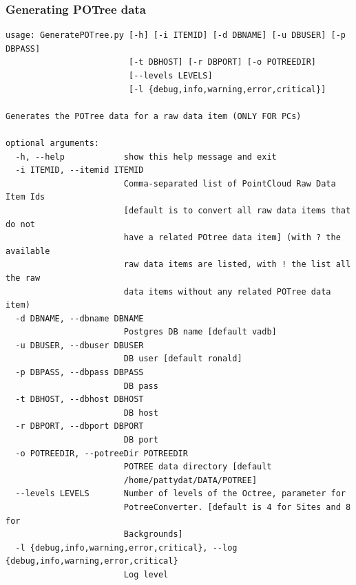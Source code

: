 \subsubsection{Generating POTree data}
\label{sec:generatePOTree}
\begin{Verbatim}[fontfamily=courier,commandchars=\\\{\},fontsize=\footnotesize]
usage: GeneratePOTree.py [-h] [-i ITEMID] [-d DBNAME] [-u DBUSER] [-p DBPASS]
                         [-t DBHOST] [-r DBPORT] [-o POTREEDIR]
                         [--levels LEVELS]
                         [-l {debug,info,warning,error,critical}]

Generates the POTree data for a raw data item (ONLY FOR PCs)

optional arguments:
  -h, --help            show this help message and exit
  -i ITEMID, --itemid ITEMID
                        Comma-separated list of PointCloud Raw Data Item Ids
                        [default is to convert all raw data items that do not
                        have a related POtree data item] (with ? the available
                        raw data items are listed, with ! the list all the raw
                        data items without any related POTree data item)
  -d DBNAME, --dbname DBNAME
                        Postgres DB name [default vadb]
  -u DBUSER, --dbuser DBUSER
                        DB user [default ronald]
  -p DBPASS, --dbpass DBPASS
                        DB pass
  -t DBHOST, --dbhost DBHOST
                        DB host
  -r DBPORT, --dbport DBPORT
                        DB port
  -o POTREEDIR, --potreeDir POTREEDIR
                        POTREE data directory [default
                        /home/pattydat/DATA/POTREE]
  --levels LEVELS       Number of levels of the Octree, parameter for
                        PotreeConverter. [default is 4 for Sites and 8 for
                        Backgrounds]
  -l {debug,info,warning,error,critical}, --log {debug,info,warning,error,critical}
                        Log level
\end{Verbatim}

